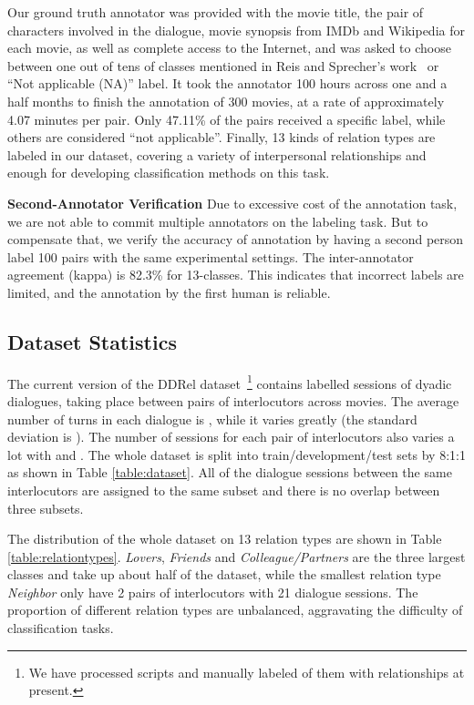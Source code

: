 \documentclass[letterpaper]{article} \usepackage{aaai21}  \usepackage{times}  \usepackage{helvet} \usepackage{courier}  \usepackage[hyphens]{url}  \usepackage{graphicx} \usepackage{xcolor}
\begin{document}
Our ground truth annotator was provided with the movie title, the pair of characters involved in the dialogue, movie synopsis from IMDb and Wikipedia for each movie, as well as complete access to the Internet, and was asked to choose between one out of tens of classes mentioned in Reis and Sprecher's work~\cite{reis2009encyclopedia} or ``Not applicable (NA)'' label.
It took the annotator 100 hours across one and a half months to finish the annotation of 300 movies, at a rate of approximately 4.07 minutes per pair. Only 47.11\% of the pairs received a specific label, while others are considered ``not applicable''. Finally, 13 kinds of relation types are labeled in our dataset, covering a variety of interpersonal relationships and enough for developing classification methods on this task.

\textbf{Second-Annotator Verification}
Due to excessive cost of the annotation task, we are not able to commit multiple annotators on the labeling task. But to compensate that, we verify the accuracy of annotation by having a second person label 100 pairs with the same experimental settings. The inter-annotator agreement (kappa) is 82.3\% for 13-classes. This indicates that incorrect labels are limited, and the annotation by the first human is reliable.




\subsection{Dataset Statistics}
The current version of the DDRel dataset~\footnote{We have processed  scripts and 
	manually labeled  of them with relationships at present.}
contains  labelled sessions of dyadic dialogues, taking place between  pairs of interlocutors across  movies. 
The average number of turns in each dialogue is , 
while it varies greatly (the standard deviation is ).  The number of sessions for each pair of interlocutors also varies a lot with  and . The whole dataset is split into train/development/test sets by 8:1:1 as shown in Table \ref{table:dataset}. All of the dialogue sessions between the same interlocutors are assigned to the same subset and there is no overlap between three subsets. 


The distribution of the whole dataset on 13 relation types are shown in Table \ref{table:relationtypes}. {\em Lovers}, {\em Friends} and {\em Colleague/Partners} are the three largest classes and take up about half of the dataset, while the smallest relation type {\em Neighbor} only have 2 pairs of interlocutors with 21 dialogue sessions. The proportion of different relation types are unbalanced, aggravating the difficulty of classification tasks.
\end{document}
